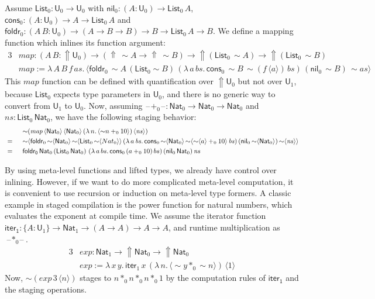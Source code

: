\documentclass[acmsmall,review]{acmart}
\newcommand{\mit}[1]{\mathit{#1}}
\newcommand{\msf}[1]{\mathsf{#1}}
\newcommand{\Lift}{{\Uparrow}}
\newcommand{\spl}{{\sim}}
\newcommand{\qut}[1]{\langle #1\rangle}
\renewcommand{\U}{\msf{U}}
\newcommand{\List}{\msf{List}}
\newcommand{\nil}{\msf{nil}}
\newcommand{\cons}{\msf{cons}}
\newcommand{\Nat}{\msf{Nat}}
\newcommand{\blank}{{\mathord{\hspace{1pt}\text{--}\hspace{1pt}}}}
\theoremstyle{remark}
\begin{document}
Assume $\List_0 : \U_0 \to \U_0$ with $\nil_0 : (A : \U_0) \to \List_0\,A$,
$\cons_0 : (A : \U_0) \to A \to \List_0\,A$ and $\msf{foldr}_0 : (A\,B : \U_0)
\to (A \to B \to B) \to B \to \List_0\,A \to B$. We define a mapping function which
inlines its function argument:
\begin{alignat*}{3}
  & \mit{map} : (A\,B : \Lift\U_0) \to (\Lift\,\spl A \to \Lift\,\spl B)
      \to \Lift(\List_0\,\spl A) \to \Lift(\List_0\,\spl B)\\
  & \mit{map} := \lambda\,A\,B\,f\,\mit{as}.\,
      \qut{\msf{foldr}_0\,
        \spl A\,(\List_0 \spl B)\,
        (\lambda\,a\,\mit{bs}.\, \cons_0\,\spl B\,\spl(f\,\qut{a})\,\mit{bs})\,
        (\nil_0\,\spl B)\,
        \spl as
        }
\end{alignat*}
This $\mit{map}$ function can be defined with quantification over $\Lift \U_0$ but not
over $\U_1$, because $\List_0$ expects type parameters in $\U_0$, and there is
no generic way to convert from $\U_1$ to $\U_0$. Now, assuming
$\blank\!+_0\!\blank : \Nat_0 \to \Nat_0 \to \Nat_0$ and $\mit{ns} :
\List_0\,\Nat_0$, we have the following staging behavior:
\begin{alignat*}{3}
  & &&\spl(\mit{map}\,\qut{\Nat_0}\,\qut{\Nat_0}\,(\lambda\,n.\,\qut{\spl n +_0 10})\,\qut{\mit{ns}})\\
  & =\hspace{0.5em}&&\spl\qut{\msf{foldr}_0\,
        \spl \qut{\Nat_0}\,\spl \qut{\List_0\,\spl\qut{Nat_0}}\,
        (\lambda\,a\,\mit{bs}.\, \cons_0\,\spl\qut{\Nat_0}\,\spl\qut{\spl\qut{a} +_0 10}\,\mit{bs})\,
        (\nil_0\,\spl \qut{\Nat_0})\,
        \spl\qut{\mit{ns}}}\\
  & =\hspace{0.5em} &&\msf{foldr_0}\,\Nat_0\,(\List_0\,\Nat_0)\,\,(\lambda\,a\,bs.\,\cons_0\,(a +_0 10)\,bs)\,(\nil_0\,\Nat_0)\,\mit{ns}
\end{alignat*}

By using meta-level functions and lifted types, we already have control over
inlining. However, if we want to do more complicated meta-level computation, it
is convenient to use recursion or induction on meta-level type formers. A
classic example in staged compilation is the power function for natural numbers,
which evaluates the exponent at compile time. We assume the iterator function
$\msf{iter_1} : \{A : \U_1\} \to \Nat_1 \to (A \to A) \to A \to A$, and runtime
multiplication as $\blank\!*_0\!\blank$.
\begin{alignat*}{3}
  &\mit{exp} : \Nat_1 \to \Lift \Nat_0 \to \Lift \Nat_0 \\
  &\mit{exp} := \lambda\,x\,y.\,
  \msf{iter}_1\,x\,(\lambda\,n.\,\qut{\spl y *_0 \spl n})\,\qut{1}
\end{alignat*}
Now, $\spl(\mit{exp}\,3\,\qut{n})$ stages to $n *_0 n *_0 n *_0 1$ by the computation rules
of $\msf{iter_1}$ and the staging operations.
\end{document}
